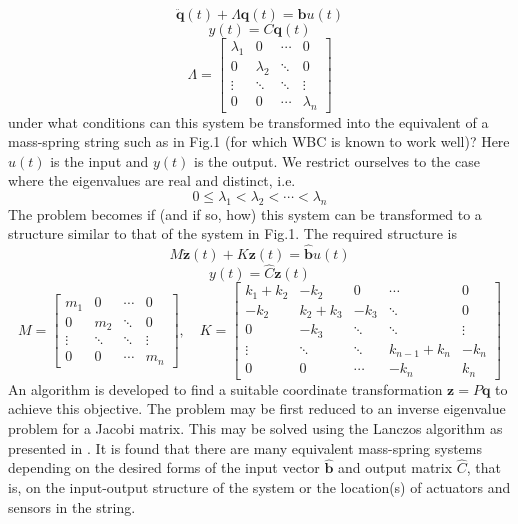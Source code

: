 \documentclass{mbd_fullpaper}
\begin{document}
\begin{equation}
\ddot{\mathbf{q}}(t) + \Lambda\mathbf{q}(t) = \mathbf{b}u(t)
\label{eq:modal1}
\end{equation}
\begin{equation}
y(t) = C \mathbf{q}(t)
\label{eq:modal2}
\end{equation}
\begin{equation}
\Lambda = \begin{bmatrix}
\lambda_1  &  0 & \cdots & 0 \\
0 & \lambda_2  & \ddots & 0 \\
\vdots & \ddots & \ddots & \vdots \\
0 & 0 & \cdots & \lambda_n \end{bmatrix}
\end{equation}
under what conditions can this system be transformed into the equivalent of a mass-spring string such as in Fig.1 (for which WBC is known to work well)?
Here $u(t)$ is the input and $y(t)$ is the output.
We restrict ourselves to the case where the eigenvalues are real and distinct, i.e.
\begin{equation}
0 \leq \lambda_1<\lambda_2< \cdots <\lambda_n
\label{eq:lambda}
\end{equation}
The problem becomes if (and if so, how) this system can be transformed to a structure similar to that of the system in Fig.1.
The required structure is
\begin{equation}
M\ddot{\mathbf{z}}(t) + K\mathbf{z}(t) = \mathbf{\hat{b}}u(t)
\label{eq:eom1}
\end{equation}
\begin{equation}
y(t) = \hat{C} \mathbf{z}(t)
\label{eq:eom2}
\end{equation}
\begin{equation}
M = \begin{bmatrix}
m_1  &  0 & \cdots & 0 \\
0 & m_2  & \ddots & 0 \\
\vdots & \ddots & \ddots & \vdots \\
0 & 0 & \cdots & m_n \end{bmatrix}
, \quad
K = \begin{bmatrix}
k_1+k_2  &  -k_2 & 0 & \cdots & 0 \\
-k_2 & k_2+k_3  & -k_3 & \ddots & 0 \\
0 & -k_3 & \ddots & \ddots & \vdots \\
\vdots & \ddots & \ddots & k_{n-1}+k_n & -k_{n} \\
0 & 0 & \cdots & -k_{n} & k_n \end{bmatrix}
\end{equation}
An algorithm is developed to find a suitable coordinate transformation $\mathbf{z} = P \mathbf{q}$ to achieve this objective.
The problem may be first reduced to an inverse eigenvalue problem for a Jacobi matrix. This may be solved using the Lanczos algorithm as presented in \cite{gladwell1986inverse}. 
It is found that there are many equivalent mass-spring systems depending on the desired forms of the input vector $\hat{\mathbf{b}}$ and output matrix $\hat{C}$, that is, on the input-output structure of the system or the location(s) of actuators and sensors in the string.
\end{document}
